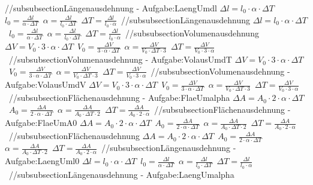 //subsubsection{Längenausdehnung - Aufgabe:LaengUmdl} 
$ \Delta l = l_{0} \cdot \alpha \cdot \Delta T $\ 
$ l_{0}  = \frac{ \Delta l}{\alpha \cdot \Delta T} $\ 
$ \alpha  = \frac{ \Delta l}{l_{0} \cdot \Delta T} $\ 
$ \Delta T = \frac{ \Delta l}{l_{0} \cdot \alpha } $\ 
//subsubsection{Längenausdehnung} 
$ \Delta l = l_{0} \cdot \alpha \cdot \Delta T $\ 
$ l_{0}  = \frac{ \Delta l}{\alpha \cdot \Delta T} $\ 
$ \alpha  = \frac{ \Delta l}{l_{0} \cdot \Delta T} $\ 
$ \Delta T = \frac{ \Delta l}{l_{0} \cdot \alpha } $\ 
//subsubsection{Volumenausdehnung} 
$ \Delta V = V_{0} \cdot 3\cdot \alpha \cdot \Delta T $\ 
$ V_{0}  = \frac{  \Delta V}{3\cdot \alpha \cdot \Delta T} $\ 
$ \alpha  = \frac{  \Delta V}{V_{0} \cdot \Delta T\cdot 3} $\ 
$ \Delta T = \frac{  \Delta V}{V_{0} \cdot 3\cdot \alpha } $\ 
//subsubsection{Volumenausdehnung - Aufgabe:VolausUmdT} 
$ \Delta V = V_{0} \cdot 3\cdot \alpha \cdot \Delta T $\ 
$ V_{0}  = \frac{  \Delta V}{3\cdot \alpha \cdot \Delta T} $\ 
$ \alpha  = \frac{  \Delta V}{V_{0} \cdot \Delta T\cdot 3} $\ 
$ \Delta T = \frac{  \Delta V}{V_{0} \cdot 3\cdot \alpha } $\ 
//subsubsection{Volumenausdehnung - Aufgabe:VolausUmdV} 
$ \Delta V = V_{0} \cdot 3\cdot \alpha \cdot \Delta T $\ 
$ V_{0}  = \frac{  \Delta V}{3\cdot \alpha \cdot \Delta T} $\ 
$ \alpha  = \frac{  \Delta V}{V_{0} \cdot \Delta T\cdot 3} $\ 
$ \Delta T = \frac{  \Delta V}{V_{0} \cdot 3\cdot \alpha } $\ 
//subsubsection{Flächenausdehnung - Aufgabe:FlaeUmalpha} 
$ \Delta A = A_{0} \cdot 2\cdot \alpha \cdot \Delta T $\ 
$ A_{0}  = \frac{ \Delta A}{2\cdot \alpha \cdot \Delta T} $\ 
$ \alpha  = \frac{ \Delta A}{A_{0} \cdot \Delta T\cdot 2} $\ 
$ \Delta T = \frac{ \Delta A}{A_{0} \cdot 2\cdot \alpha } $\ 
//subsubsection{Flächenausdehnung - Aufgabe:FlaeUmA0} 
$ \Delta A = A_{0} \cdot 2\cdot \alpha \cdot \Delta T $\ 
$ A_{0}  = \frac{ \Delta A}{2\cdot \alpha \cdot \Delta T} $\ 
$ \alpha  = \frac{ \Delta A}{A_{0} \cdot \Delta T\cdot 2} $\ 
$ \Delta T = \frac{ \Delta A}{A_{0} \cdot 2\cdot \alpha } $\ 
//subsubsection{Flächenausdehnung} 
$ \Delta A = A_{0} \cdot 2\cdot \alpha \cdot \Delta T $\ 
$ A_{0}  = \frac{ \Delta A}{2\cdot \alpha \cdot \Delta T} $\ 
$ \alpha  = \frac{ \Delta A}{A_{0} \cdot \Delta T\cdot 2} $\ 
$ \Delta T = \frac{ \Delta A}{A_{0} \cdot 2\cdot \alpha } $\ 
//subsubsection{Längenausdehnung - Aufgabe:LaengUml0} 
$ \Delta l = l_{0} \cdot \alpha \cdot \Delta T $\ 
$ l_{0}  = \frac{ \Delta l}{\alpha \cdot \Delta T} $\ 
$ \alpha  = \frac{ \Delta l}{l_{0} \cdot \Delta T} $\ 
$ \Delta T = \frac{ \Delta l}{l_{0} \cdot \alpha } $\ 
//subsubsection{Längenausdehnung - Aufgabe:LaengUmalpha} 
